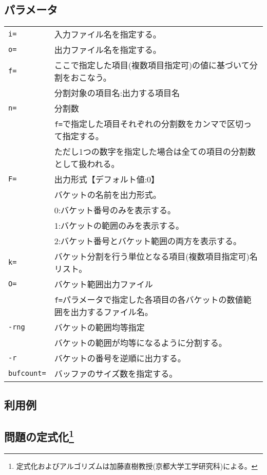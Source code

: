 \subsection*{パラメータ}
\begin{table}[htbp]
{\small
\begin{tabular}{ll}
\verb|i=|    & 入力ファイル名を指定する。\\
\verb|o=|    & 出力ファイル名を指定する。\\
\verb|f=|    & ここで指定した項目(複数項目指定可)の値に基づいて分割をおこなう。\\
             & 分割対象の項目名:出力する項目名\\
\verb|n=|    & 分割数\\
             & \verb|f=|で指定した項目それぞれの分割数をカンマで区切って指定する。\\
             & ただし1つの数字を指定した場合は全ての項目の分割数として扱われる。
\\
\verb|F=|    & 出力形式【デフォルト値:0】\\
             & バケットの名前を出力形式。\\
             & 0:バケット番号のみを表示する。\\
             & 1:バケットの範囲のみを表示する。\\
             & 2:バケット番号とバケット範囲の両方を表示する。\\
\verb|k=|    & バケット分割を行う単位となる項目(複数項目指定可)名リスト。\\
\verb|O=|    & バケット範囲出力ファイル\\
             & \verb|f=|パラメータで指定した各項目の各バケットの数値範囲を出力するファイル名。\\
\verb|-rng|  & バケットの範囲均等指定 \\
             & バケットの範囲が均等になるように分割する。\\
\verb|-r|    & バケットの番号を逆順に出力する。 \\
\verb|bufcount=| & バッファのサイズ数を指定する。 \\
\end{tabular} 
}
\end{table} 


\subsection*{利用例}

\subsection*{問題の定式化\footnote{定式化およびアルゴリズムは加藤直樹教授(京都大学工学研究科)による。}}

